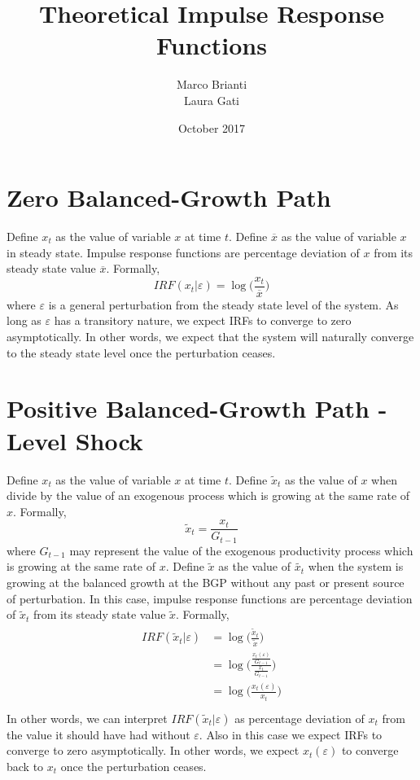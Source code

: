 \documentclass{article}
\title{Theoretical Impulse Response Functions}
\author{Marco Brianti\\Laura Gati}
\date{October 2017}
\begin{document}
	
	\maketitle
	
	\section{Zero Balanced-Growth Path}
	
	Define $x_t$ as the value of variable $x$ at time $t$. Define $\overline{x}$ as the value of variable $x$ in steady state. Impulse response functions are percentage deviation of $x$ from its steady state value $\overline{x}$. Formally,
$$
IRF(x_t | \varepsilon) = \log \bigg( \frac{x_t}{\overline{x}}  \bigg)
$$
where $\varepsilon$ is a general perturbation from the steady state level of the system. As long as $\varepsilon$ has a transitory nature, we expect IRFs to converge to zero asymptotically. In other words, we expect that the system will naturally converge to the steady state level once the perturbation ceases.
	
\section{Positive Balanced-Growth Path - Level Shock}

Define $x_t$ as the value of variable $x$ at time $t$. Define $\tilde{x}_t$ as the value of $x$ when divide by the value of an exogenous process which is growing at the same rate of $x$. Formally,
$$
\tilde{x}_t = \frac{x_t}{G_{t-1}}
$$
where $G_{t-1}$ may represent the value of the exogenous productivity process which is growing at the same rate of $x$. Define $\tilde{x}$ as the value of $\tilde{x_t}$ when the system is growing at the balanced growth at the BGP without any past or present source of perturbation. In this case, impulse response functions are percentage deviation of $\tilde{x}_t$ from its steady state value $\tilde{x}$. Formally,
\begin{eqnarray}
\begin{aligned}
IRF(\tilde{x}_t | \varepsilon) &= \log \bigg( \frac{\tilde{x}_t}{\tilde{x}}  \bigg)  \\
                               &= \log \bigg( \frac{\frac{x_t(\varepsilon)}{G_{t-1}}}{\frac{x_t}{G_{t-1}}}  \bigg)  \\
                               &= \log \bigg( \frac{x_t(\varepsilon)}{x_t} \bigg)  \\
\end{aligned}
\end{eqnarray}
In other words, we can interpret $IRF(\tilde{x}_t | \varepsilon)$ as percentage deviation of $x_t$ from the value it should have had without $\varepsilon$. Also in this case we expect IRFs to converge to zero asymptotically. In other words, we expect $x_t(\varepsilon)$ to converge back to $x_t$ once the perturbation ceases.
\end{document}
